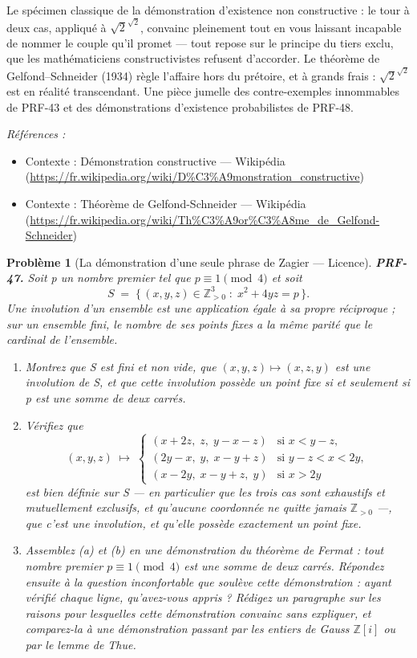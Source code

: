 \documentclass[11pt]{article}
\newtheorem{problem}{Problème}
\newenvironment{refs}{\par\small\noindent\emph{Références :}\begin{itemize}\setlength\itemsep{0pt}}{\end{itemize}\normalsize}
\begin{document}
\noindent Le spécimen classique de la démonstration d'existence non constructive :
le tour à deux cas, appliqué à $ \sqrt{2}^{\sqrt{2}} $, convainc pleinement tout en vous
laissant incapable de nommer le couple qu'il promet --- tout repose sur le principe du tiers
exclu, que les mathématiciens constructivistes refusent d'accorder. Le théorème de
Gelfond--Schneider (1934) règle l'affaire hors du prétoire, et à grands frais :
$ \sqrt{2}^{\sqrt{2}} $ est en réalité transcendant. Une pièce jumelle des contre-exemples
innommables de PRF-43 et des démonstrations d'existence probabilistes de PRF-48.

\begin{refs}
\item Contexte : Démonstration constructive --- Wikipédia (\url{https://fr.wikipedia.org/wiki/D%C3%A9monstration_constructive})
\item Contexte : Théorème de Gelfond-Schneider --- Wikipédia (\url{https://fr.wikipedia.org/wiki/Th%C3%A9or%C3%A8me_de_Gelfond-Schneider})
\end{refs}

\bigskip

\begin{problem}[{La démonstration d'une seule phrase de Zagier --- Licence}]
\textbf{PRF-47.} Soit p un nombre premier tel que $ p \equiv 1 \pmod 4 $ et soit
\[ S \;=\; \{\, (x,y,z) \in \mathbb{Z}_{>0}^{3} \;:\; x^{2} + 4yz = p \,\}. \]
Une \textit{involution} d'un ensemble est une application égale à sa propre réciproque ; sur un
ensemble fini, le nombre de ses points fixes a la même parité que le cardinal de
l'ensemble.
\begin{enumerate}
\item[(a)] Montrez que S est fini et non vide, que $ (x,y,z) \mapsto (x,z,y) $ est une
involution de S, et que cette involution possède un point fixe si et seulement si p est une
somme de deux carrés.
\item[(b)] Vérifiez que
\[ (x,y,z) \;\longmapsto\;
\begin{cases}
(x+2z,\; z,\; y-x-z) & \text{si } x <y-z,\\
(2y-x,\; y,\; x-y+z) & \text{si } y-z <x <2y,\\
(x-2y,\; x-y+z,\; y) & \text{si } x >2y
\end{cases} \]
est bien définie sur S --- en particulier que les trois cas sont exhaustifs et mutuellement
exclusifs, et qu'aucune coordonnée ne quitte jamais $ \mathbb{Z}_{>0} $ ---, que c'est
une involution, et qu'elle possède exactement un point fixe.
\item[(c)] Assemblez (a) et (b) en une démonstration du théorème de Fermat : tout nombre premier
$ p \equiv 1 \pmod 4 $ est une somme de deux carrés. Répondez ensuite à la question
inconfortable que soulève cette démonstration : ayant vérifié chaque ligne, qu'avez-vous
appris ? Rédigez un paragraphe sur les raisons pour lesquelles cette démonstration convainc
sans expliquer, et comparez-la à une démonstration passant par les entiers de Gauss
$ \mathbb{Z}[i] $ ou par le lemme de Thue.
\end{enumerate}

\end{problem}
\end{document}
